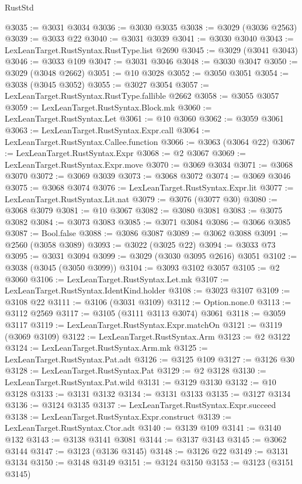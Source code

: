 \begin{lexlean}{RustStd}
\begin{coremodule}
@3035 := @3031 @3034
@3036 := @3030 @3035
@3038 := @3029 (@3036 @2563)
@3039 := @3033 @22
@3040 := @3031 @3039
@3041 := @3030 @3040
@3043 := LexLeanTarget.RustSyntax.RustType.list @2690
@3045 := @3029 (@3041 @3043)
@3046 := @3033 @109
@3047 := @3031 @3046
@3048 := @3030 @3047
@3050 := @3029 (@3048 @2662)
@3051 := @10 @3028
@3052 := @3050 @3051
@3054 := @3038 (@3045 @3052)
@3055 := @3027 @3054
@3057 := LexLeanTarget.RustSyntax.RustType.fallible @2662
@3058 := @3055 @3057
@3059 := LexLeanTarget.RustSyntax.Block.mk
@3060 := LexLeanTarget.RustSyntax.Let
@3061 := @10 @3060
@3062 := @3059 @3061
@3063 := LexLeanTarget.RustSyntax.Expr.call
@3064 := LexLeanTarget.RustSyntax.Callee.function
@3066 := @3063 (@3064 @22)
@3067 := LexLeanTarget.RustSyntax.Expr
@3068 := @2 @3067
@3069 := LexLeanTarget.RustSyntax.Expr.move
@3070 := @3069 @3034
@3071 := @3068 @3070
@3072 := @3069 @3039
@3073 := @3068 @3072
@3074 := @3069 @3046
@3075 := @3068 @3074
@3076 := LexLeanTarget.RustSyntax.Expr.lit
@3077 := LexLeanTarget.RustSyntax.Lit.nat
@3079 := @3076 (@3077 @30)
@3080 := @3068 @3079
@3081 := @10 @3067
@3082 := @3080 @3081
@3083 := @3075 @3082
@3084 := @3073 @3083
@3085 := @3071 @3084
@3086 := @3066 @3085
@3087 := Bool.false
@3088 := @3086 @3087
@3089 := @3062 @3088
@3091 := @2560 (@3058 @3089)
@3093 := @3022 (@3025 @22)
@3094 := @3033 @73
@3095 := @3031 @3094
@3099 := @3029 (@3030 @3095 @2616) @3051
@3102 := @3038 (@3045 (@3050 @3099))
@3104 := @3093 @3102 @3057
@3105 := @2 @3060
@3106 := LexLeanTarget.RustSyntax.Let.mk
@3107 := LexLeanTarget.RustSyntax.IdentKind.holder
@3108 := @3023 @3107
@3109 := @3108 @22
@3111 := @3106 (@3031 @3109)
@3112 := Option.none.{0}
@3113 := @3112 @2569
@3117 := @3105 (@3111 @3113 @3074) @3061
@3118 := @3059 @3117
@3119 := LexLeanTarget.RustSyntax.Expr.matchOn
@3121 := @3119 (@3069 @3109)
@3122 := LexLeanTarget.RustSyntax.Arm
@3123 := @2 @3122
@3124 := LexLeanTarget.RustSyntax.Arm.mk
@3125 := LexLeanTarget.RustSyntax.Pat.adt
@3126 := @3125 @109
@3127 := @3126 @30
@3128 := LexLeanTarget.RustSyntax.Pat
@3129 := @2 @3128
@3130 := LexLeanTarget.RustSyntax.Pat.wild
@3131 := @3129 @3130
@3132 := @10 @3128
@3133 := @3131 @3132
@3134 := @3131 @3133
@3135 := @3127 @3134
@3136 := @3124 @3135
@3137 := LexLeanTarget.RustSyntax.Expr.succeed
@3138 := LexLeanTarget.RustSyntax.Expr.construct
@3139 := LexLeanTarget.RustSyntax.Ctor.adt
@3140 := @3139 @109
@3141 := @3140 @132
@3143 := @3138 @3141 @3081
@3144 := @3137 @3143
@3145 := @3062 @3144
@3147 := @3123 (@3136 @3145)
@3148 := @3126 @22
@3149 := @3131 @3134
@3150 := @3148 @3149
@3151 := @3124 @3150
@3153 := @3123 (@3151 @3145)

\end{coremodule}
\end{lexlean}
